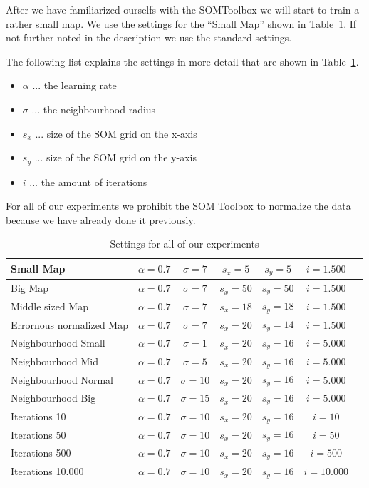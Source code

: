 \documentclass{acm_proc_article-sp}
\begin{document}
After we have familiarized ourselfs with the SOMToolbox we will start to train a rather small
map. We use the settings for the ``Small Map'' shown in Table~\ref{tab:settings}. If not further
noted in the description we use the standard settings.

The following list explains the settings in more detail that are shown in Table~\ref{tab:settings}.

\begin{itemize}
    \item $\alpha$ ... the learning rate
    \item $\sigma$ ... the neighbourhood radius
    \item $s_x$ ... size of the SOM grid on the x-axis
    \item $s_y$ ... size of the SOM grid on the y-axis
    \item $i$ ... the amount of iterations
\end{itemize}

For all of our experiments we prohibit the SOM Toolbox to normalize the data because we have
already done it previously.

\begin{table}
\centering
\begin{tabular}{|l|c|c|c|c|c|c|}
    \hline
    Small Map & $\alpha = 0.7$ & $\sigma = 7$ & $s_x=5$ & $s_y=5$ & $i=1.500$ \\
    \hline
    Big Map & $\alpha = 0.7$ & $\sigma = 7$ & $s_x=50$ & $s_y=50$ & $i=1.500$ \\
    \hline
    Middle sized Map & $\alpha = 0.7$ & $\sigma = 7$ & $s_x=18$ & $s_y=18$ & $i=1.500$ \\
    \hline
    Errornous normalized Map & $\alpha = 0.7$ & $\sigma = 7$ & $s_x=20$ & $s_y=14$ & $i=1.500$ \\
    \hline
    Neighbourhood Small & $\alpha = 0.7$ & $\sigma = 1$ & $s_x=20$ & $s_y=16$ & $i=5.000$ \\
    \hline
    Neighbourhood Mid & $\alpha = 0.7$ & $\sigma = 5$ & $s_x=20$ & $s_y=16$ & $i=5.000$ \\
    \hline
    Neighbourhood Normal & $\alpha = 0.7$ & $\sigma = 10$ & $s_x=20$ & $s_y=16$ & $i=5.000$ \\
    \hline
    Neighbourhood Big & $\alpha = 0.7$ & $\sigma = 15$ & $s_x=20$ & $s_y=16$ & $i=5.000$ \\
    \hline
    Iterations 10 & $\alpha = 0.7$ & $\sigma = 10$ & $s_x=20$ & $s_y=16$ & $i=10$ \\
    \hline
    Iterations 50 & $\alpha = 0.7$ & $\sigma = 10$ & $s_x=20$ & $s_y=16$ & $i=50$ \\
    \hline
    Iterations 500 & $\alpha = 0.7$ & $\sigma = 10$ & $s_x=20$ & $s_y=16$ & $i=500$ \\
    \hline
    Iterations 10.000 & $\alpha = 0.7$ & $\sigma = 10$ & $s_x=20$ & $s_y=16$ & $i=10.000$ \\
    \hline
\end{tabular}
\caption{Settings for all of our experiments}
\label{tab:settings}
\end{table}
\end{document}

